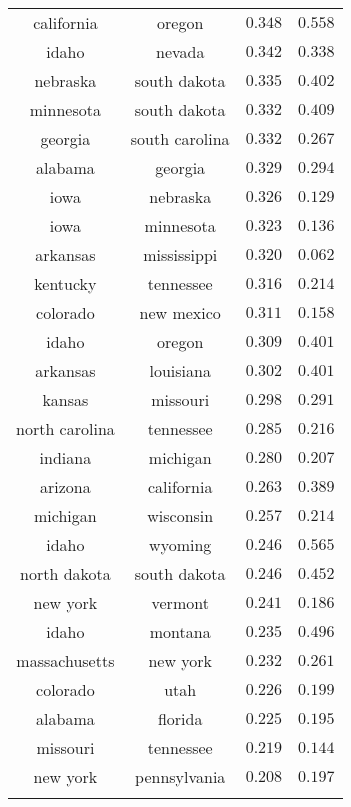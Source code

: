 \begin{table}[!htbp]
\begin{tabular}{@{\extracolsep{5pt}} cccc}
california & oregon & $0.348$ & $0.558$ \\ 
idaho & nevada & $0.342$ & $0.338$ \\ 
nebraska & south dakota & $0.335$ & $0.402$ \\ 
minnesota & south dakota & $0.332$ & $0.409$ \\ 
georgia & south carolina & $0.332$ & $0.267$ \\ 
alabama & georgia & $0.329$ & $0.294$ \\ 
iowa & nebraska & $0.326$ & $0.129$ \\ 
iowa & minnesota & $0.323$ & $0.136$ \\ 
arkansas & mississippi & $0.320$ & $0.062$ \\ 
kentucky & tennessee & $0.316$ & $0.214$ \\ 
colorado & new mexico & $0.311$ & $0.158$ \\ 
idaho & oregon & $0.309$ & $0.401$ \\ 
arkansas & louisiana & $0.302$ & $0.401$ \\ 
kansas & missouri & $0.298$ & $0.291$ \\ 
north carolina & tennessee & $0.285$ & $0.216$ \\ 
indiana & michigan & $0.280$ & $0.207$ \\ 
arizona & california & $0.263$ & $0.389$ \\ 
michigan & wisconsin & $0.257$ & $0.214$ \\ 
idaho & wyoming & $0.246$ & $0.565$ \\ 
north dakota & south dakota & $0.246$ & $0.452$ \\ 
new york & vermont & $0.241$ & $0.186$ \\ 
idaho & montana & $0.235$ & $0.496$ \\ 
massachusetts & new york & $0.232$ & $0.261$ \\ 
colorado & utah & $0.226$ & $0.199$ \\ 
alabama & florida & $0.225$ & $0.195$ \\ 
missouri & tennessee & $0.219$ & $0.144$ \\ 
new york & pennsylvania & $0.208$ & $0.197$ \\ 
\hline \\[-1.8ex] 
\end{tabular} 
\end{table} 
